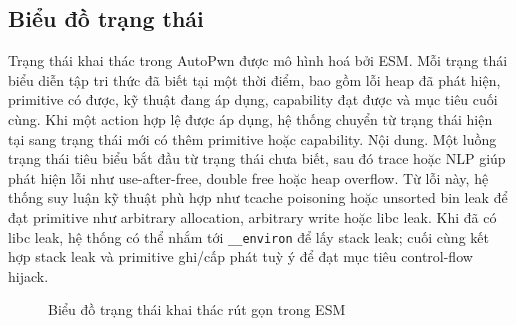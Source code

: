 \documentclass[final]{hcmuitthesis}
\begin{document}
\subsection{Biểu đồ trạng thái}
Trạng thái khai thác trong AutoPwn được mô hình hoá bởi ESM. Mỗi trạng thái biểu diễn tập tri thức đã biết tại một thời điểm, bao gồm lỗi heap đã phát hiện, primitive có được, kỹ thuật đang áp dụng, capability đạt được và mục tiêu cuối cùng. Khi một action hợp lệ được áp dụng, hệ thống chuyển từ trạng thái hiện tại sang trạng thái mới có thêm primitive hoặc capability.
Nội dung.
Một luồng trạng thái tiêu biểu bắt đầu từ trạng thái chưa biết, sau đó trace hoặc NLP giúp phát hiện lỗi như use-after-free, double free hoặc heap overflow. Từ lỗi này, hệ thống suy luận kỹ thuật phù hợp như tcache poisoning hoặc unsorted bin leak để đạt primitive như arbitrary allocation, arbitrary write hoặc libc leak. Khi đã có libc leak, hệ thống có thể nhắm tới \texttt{\_\_environ} để lấy stack leak; cuối cùng kết hợp stack leak và primitive ghi/cấp phát tuỳ ý để đạt mục tiêu control-flow hijack.
\begin{figure}[H]
    \centering
    \caption{Biểu đồ trạng thái khai thác rút gọn trong ESM}
\end{figure}
\end{document}
